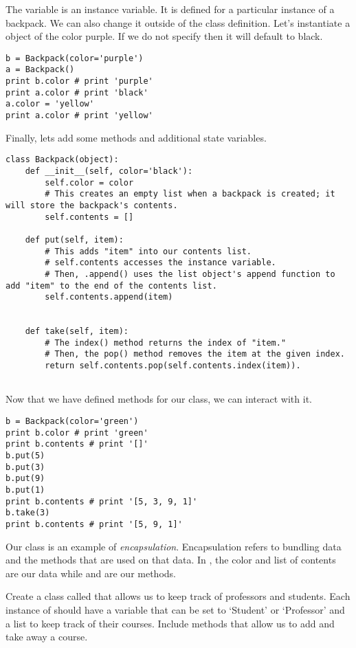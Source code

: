 The variable  is an instance variable. It is defined for a particular instance of a backpack.
We can also change it outside of the class definition.
Let's instantiate a  object of the color purple.
If we do not specify then it will default to black.

\begin{lstlisting}
b = Backpack(color='purple')
a = Backpack()
print b.color # print 'purple'
print a.color # print 'black'
a.color = 'yellow'
print a.color # print 'yellow'
\end{lstlisting}


Finally, lets add some methods and additional state variables.

\begin{lstlisting}
class Backpack(object):
    def __init__(self, color='black'):
        self.color = color
        # This creates an empty list when a backpack is created; it will store the backpack's contents.
        self.contents = []

    def put(self, item):
        # This adds "item" into our contents list.
        # self.contents accesses the instance variable.
        # Then, .append() uses the list object's append function to add "item" to the end of the contents list.
        self.contents.append(item)


    def take(self, item):
        # The index() method returns the index of "item."
        # Then, the pop() method removes the item at the given index.
        return self.contents.pop(self.contents.index(item)).


\end{lstlisting}

Now that we have defined methods for our  class, we can interact with it.


\begin{lstlisting}
b = Backpack(color='green')
print b.color # print 'green'
print b.contents # print '[]'
b.put(5)
b.put(3)
b.put(9)
b.put(1)
print b.contents # print '[5, 3, 9, 1]'
b.take(3)
print b.contents # print '[5, 9, 1]'
\end{lstlisting}

Our  class is an example of \emph{encapsulation}.
Encapsulation refers to bundling data and the methods that are used on that data.
In , the color and list of contents are our data while  and  are our methods.

\begin{problem}
Create a class called  that allows us to keep track of professors and students.
Each instance of  should have a variable that can be set to `Student' or `Professor' and a list to keep track of their courses.
Include methods that allow us to add and take away a course.
\label{School}
\end{problem}

